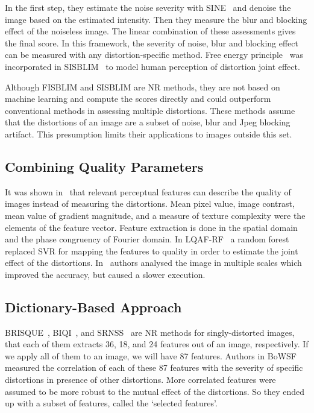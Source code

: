 In the first step, they estimate the noise severity with SINE~\cite{Zoran2009} and denoise the image based on the estimated intensity. Then they measure the blur and blocking effect of the noiseless image. The linear combination of these assessments gives the final score. In this framework, the severity of noise, blur and blocking effect can be measured with any distortion-specific method. Free energy principle~\cite{Friston2010} was incorporated in SISBLIM~\cite{Gu2014} to model human perception of distortion joint effect.

Although FISBLIM and SISBLIM are NR methods, they are not based on machine learning and compute the scores directly and could outperform conventional methods in assessing multiple distortions. These methods assume that the distortions of an image are a subset of noise, blur and Jpeg blocking artifact. This presumption limits their applications to images outside this set.
\subsection{Combining Quality Parameters}
It was shown in~\cite{Li2015relevant} that relevant perceptual features can describe the quality of images instead of measuring the distortions. Mean pixel value, image contrast, mean value of gradient magnitude, and a measure of texture complexity were the elements of the feature vector. Feature extraction is done in the spatial domain and the phase congruency of Fourier domain. In LQAF-RF~\cite{Ma2017forest} a random forest replaced SVR for mapping the features to quality in order to estimate the joint effect of the distortions. In~\cite{Li2018access} authors analysed the image in multiple scales which improved the accuracy, but caused a slower execution.
\subsection{Dictionary-Based Approach}
BRISQUE~\cite{Mittal2012a}, BIQI~\cite{Moorthy2010}, and SRNSS~\cite{He2012srnss} are NR methods for singly-distorted images, that each of them extracts 36, 18, and 24 features out of an image, respectively. If we apply all of them to an image, we will have 87 features. Authors in BoWSF~\cite{lu2015no} measured the correlation of each of these 87 features with the severity of specific distortions in presence of other distortions. More correlated features were assumed to be more robust to the mutual effect of the distortions. So they ended up with a subset of features, called the `selected features'.

